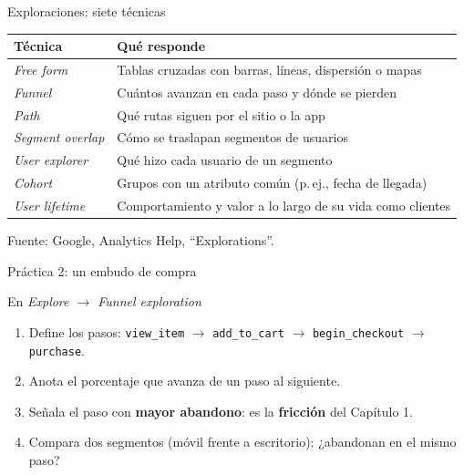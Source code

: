 \documentclass[aspectratio=169,xcolor=dvipsnames]{beamer}
\newcommand{\fuente}[1]{{\tiny\color{IPNgris}Fuente: #1}}
\begin{document}
\begin{frame}{Exploraciones: siete técnicas}
\footnotesize
\begin{center}
\begin{tabular}{@{}>{\raggedright}p{3.2cm}>{\raggedright\arraybackslash}p{8.6cm}@{}}
\toprule
\textbf{Técnica} & \textbf{Qué responde} \\
\midrule
\textit{Free form} & Tablas cruzadas con barras, líneas, dispersión o mapas \\
\textit{Funnel} & Cuántos avanzan en cada paso y dónde se pierden \\
\textit{Path} & Qué rutas siguen por el sitio o la app \\
\textit{Segment overlap} & Cómo se traslapan segmentos de usuarios \\
\textit{User explorer} & Qué hizo cada usuario de un segmento \\
\textit{Cohort} & Grupos con un atributo común (p.\,ej., fecha de llegada) \\
\textit{User lifetime} & Comportamiento y valor a lo largo de su vida como clientes \\
\bottomrule
\end{tabular}
\end{center}
\fuente{Google, Analytics Help, \enquote{Explorations}.}
\end{frame}

\begin{frame}{Práctica 2: un embudo de compra}
\begin{block}{En \textit{Explore $\rightarrow$ Funnel exploration}}
  \small
  \begin{enumerate}
    \item Define los pasos: \texttt{view\_item} $\rightarrow$ \texttt{add\_to\_cart} $\rightarrow$ \texttt{begin\_checkout} $\rightarrow$ \texttt{purchase}.
    \item Anota el porcentaje que avanza de un paso al siguiente.
    \item Señala el paso con \textbf{mayor abandono}: es la \textbf{fricción} del Capítulo 1.
    \item Compara dos segmentos (móvil frente a escritorio): ¿abandonan en el mismo paso?
  \end{enumerate}
\end{block}
\end{frame}
\end{document}
